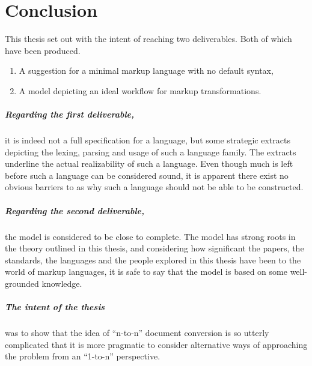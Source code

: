 \documentclass{scrreprt}
\begin{document}
%
%
%
%
%
%

\chapter{Conclusion}
This thesis set out with the intent of reaching two deliverables. Both of which have been produced.

\begin{enumerate}
\item A suggestion for a minimal markup language with no default syntax,
\item A model depicting an ideal workflow for markup transformations.
\end{enumerate}

\paragraph{Regarding the first deliverable,} it is indeed not a full specification for a language, but some strategic extracts depicting the lexing, parsing and usage of such a language family. The extracts underline the actual realizability of such a language. Even though much is left before such a language can be considered sound, it is apparent there exist no obvious barriers to as why such a language should not be able to be constructed.

\paragraph{Regarding the second deliverable,} the model is considered to be close to complete. The model has strong roots in the theory outlined in this thesis, and considering how significant the papers, the standards, the languages and the people explored in this thesis have been to the world of markup languages, it is safe to say that the model is based on some well-grounded knowledge.


\paragraph{The intent of the thesis}
was to show that the idea of ``n-to-n'' document conversion is so utterly complicated that it is more pragmatic to consider alternative ways of approaching the problem from an ``1-to-n'' perspective.
\end{document}
